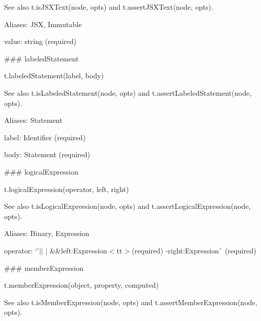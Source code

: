 See also {\ttfamily t.\+is\+J\+S\+X\+Text(node, opts)} and {\ttfamily t.\+assert\+J\+S\+X\+Text(node, opts)}.

Aliases\+: {\ttfamily J\+SX}, {\ttfamily Immutable}


\begin{DoxyItemize}
\item {\ttfamily value}\+: {\ttfamily string} (required) 


\end{DoxyItemize}

\#\#\# labeled\+Statement 
\begin{DoxyCode}
t.labeledStatement(label, body)
\end{DoxyCode}


See also {\ttfamily t.\+is\+Labeled\+Statement(node, opts)} and {\ttfamily t.\+assert\+Labeled\+Statement(node, opts)}.

Aliases\+: {\ttfamily Statement}


\begin{DoxyItemize}
\item {\ttfamily label}\+: {\ttfamily Identifier} (required)
\item {\ttfamily body}\+: {\ttfamily Statement} (required) 


\end{DoxyItemize}

\#\#\# logical\+Expression 
\begin{DoxyCode}
t.logicalExpression(operator, left, right)
\end{DoxyCode}


See also {\ttfamily t.\+is\+Logical\+Expression(node, opts)} and {\ttfamily t.\+assert\+Logical\+Expression(node, opts)}.

Aliases\+: {\ttfamily Binary}, {\ttfamily Expression}


\begin{DoxyItemize}
\item {\ttfamily operator}\+: `'$\vert$$\vert$\textquotesingle{} $\vert$ \textquotesingle{}\&\&left{\ttfamily \+:}Expression$<$tt$>$(required) -\/right{\ttfamily \+:}Expression\`{} (required) 


\end{DoxyItemize}

\#\#\# member\+Expression 
\begin{DoxyCode}
t.memberExpression(object, property, computed)
\end{DoxyCode}


See also {\ttfamily t.\+is\+Member\+Expression(node, opts)} and {\ttfamily t.\+assert\+Member\+Expression(node, opts)}.

